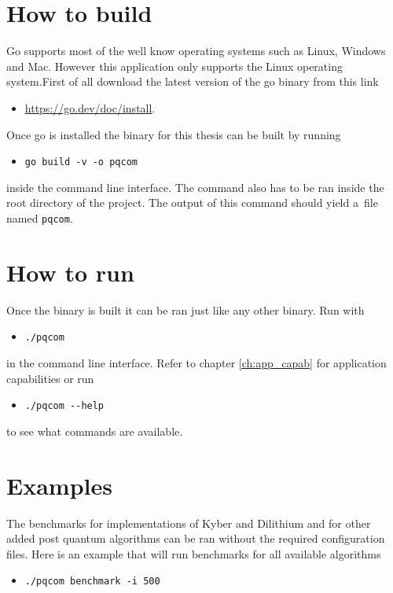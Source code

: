 \section{How to build}
Go supports most of the well know operating systems such as Linux, Windows and Mac. However this application only supports the Linux operating system.First of all download the latest version of the go binary from this link
\begin{itemize}
  \item \url{https://go.dev/doc/install}.
\end{itemize}
Once go is installed the binary for this thesis can be built by running
\begin{itemize}
  \item \texttt{go build -v -o pqcom}
\end{itemize}
inside the command line interface. The command also has to be ran inside the root directory of the project. The output of this command should yield a~file named \texttt{pqcom}.
\section{How to run}
Once the binary is built it can be ran just like any other binary. Run with
\begin{itemize}
  \item \texttt{./pqcom}
\end{itemize}
in the command line interface. Refer to chapter \ref{ch:app_capab} for application capabilities or run
\begin{itemize}
  \item \texttt{./pqcom -\--help}
\end{itemize}
to see what commands are available.
\section{Examples}
The benchmarks for implementations of Kyber and Dilithium and for other added post quantum algorithms can be ran without the required configuration files. Here is an example that will run benchmarks for all available algorithms
\begin{itemize}
  \item \texttt{./pqcom benchmark -i 500}
\end{itemize}

